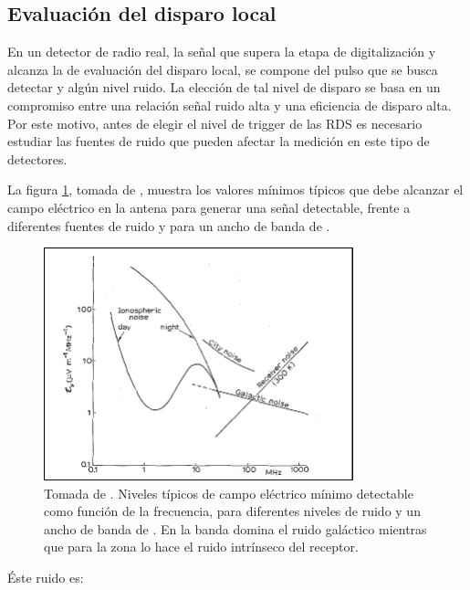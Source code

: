 	\subsection{Evaluaci\'on del disparo local}
	\label{sbsc:localTriggerRadio}
	En un detector de radio real, la se\~nal que supera la etapa de digitalizaci\'on y alcanza la de evaluaci\'on del disparo local, se compone del pulso que se busca detectar y alg\'un nivel ruido.
	La elecci\'on de tal nivel de disparo se basa en un compromiso entre una relaci\'on se\~nal ruido alta y una eficiencia de disparo alta.
	Por este motivo, antes de elegir el nivel de trigger de las RDS es necesario estudiar las fuentes de ruido que pueden afectar la medici\'on en este tipo de detectores.
	
	La figura \ref{fig:allanNoise}, tomada de \cite{allan1971}, muestra los valores m\'inimos t\'ipicos que debe alcanzar el campo el\'ectrico en la antena para generar una se\~nal detectable, frente a diferentes fuentes de ruido y para un ancho de banda de .
	\begin{figure}[ht!]
		\centering
		\includegraphics[width=0.8\textwidth]{./fig/simulacionRadio/allanNoise}
		\caption{\label{fig:allanNoise}
		Tomada de \cite{allan1971}. Niveles t\'ipicos de campo el\'ectrico m\'inimo detectable como funci\'on de la frecuencia, para diferentes niveles de ruido y un ancho de banda de .
		En la banda  domina el ruido gal\'actico mientras que para la zona  lo hace el ruido intr\'inseco del receptor.
		}
	\end{figure}
	\'Este ruido es:
